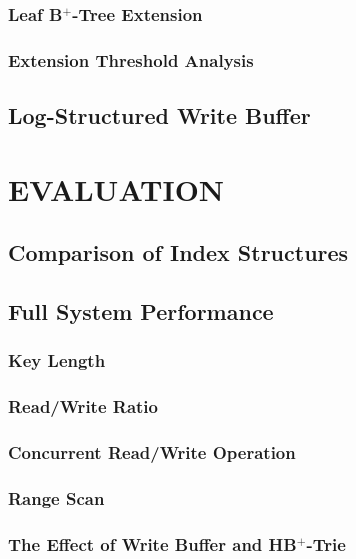 \documentclass[lang=cn]{elegantpaper}
\begin{document}
\subsubsection{Leaf B$^+$-Tree Extension}

\subsubsection{Extension Threshold Analysis}

\subsection{Log-Structured Write Buffer}

\newpage

\section{EVALUATION}

\subsection{Comparison of Index Structures}

\subsection{Full System Performance}

\subsubsection{Key Length}

\subsubsection{Read/Write Ratio}

\subsubsection{Concurrent Read/Write Operation}

\subsubsection{Range Scan}

\subsubsection{The Effect of Write Buffer and HB$^+$-Trie}
\end{document}
